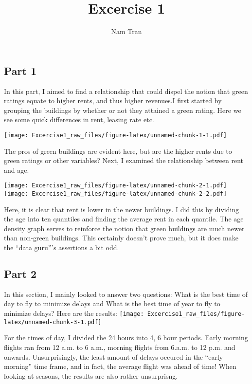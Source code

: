 \documentclass[]{article}
\title{Excercise 1}
\author{Nam Tran}
\date{}
\begin{document}
\maketitle

\subsection{Part 1}\label{part-1}

In this part, I aimed to find a relationship that could dispel the
notion that green ratings equate to higher rents, and thus higher
revenues.I first started by grouping the buildings by whether or not
they attained a green rating. Here we see some quick differences in
rent, leasing rate etc.

\texttt{[image: Excercise1\_raw\_files/figure-latex/unnamed-chunk-1-1.pdf]}

The pros of green buildings are evident here, but are the higher rents
due to green ratings or other variables? Next, I examined the
relationship between rent and age.

\texttt{[image: Excercise1\_raw\_files/figure-latex/unnamed-chunk-2-1.pdf]}
\texttt{[image: Excercise1\_raw\_files/figure-latex/unnamed-chunk-2-2.pdf]}

Here, it is clear that rent is lower in the newer buildings. I did this
by dividing the age into ten quantiles and finding the average rent in
each quantile. The age density graph serves to reinforce the notion that
green buildings are much newer than non-green buildings. This certainly
doesn't prove much, but it does make the ``data guru'''s assertions a
bit odd.

\subsection{Part 2}\label{part-2}

In this section, I mainly looked to answer two questions: What is the
best time of day to fly to minimize delays and What is the best time of
year to fly to minimize delays? Here are the results:
\texttt{[image: Excercise1\_raw\_files/figure-latex/unnamed-chunk-3-1.pdf]}

For the times of day, I divided the 24 hours into 4, 6 hour periods.
Early morning flights ran from 12 a.m. to 6 a.m., morning flights from
6.a.m. to 12 p.m. and onwards. Unsurprisingly, the least amount of
delays occured in the ``early morning'' time frame, and in fact, the
average flight was ahead of time! When looking at seasons, the results
are also rather unsurprisng.
\end{document}
